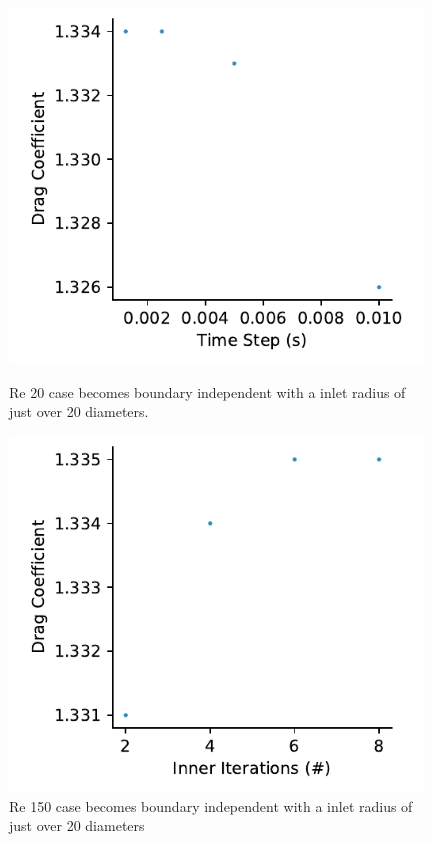 \documentclass[10pt,english]{article}
\begin{document}
\begin{figure}[h!]
\centering
\begin{minipage}{.47\textwidth}
  \centering
\includegraphics[trim={0.0cm 0cm 0.0cm 0cm},clip,width=0.98\textwidth]{timestep150}
\vspace{3pt}
\caption{Re 20 case becomes boundary independent with a inlet radius of just over 20 diameters.}
\label{f:timestep150}
\end{minipage}%
\hspace{10pt}
\begin{minipage}{.47\textwidth}
  \centering
\includegraphics[trim={0.0cm 0cm 0.0cm 0cm},clip,width=0.98\textwidth]{II150}
\caption{Re 150 case becomes boundary independent with a inlet radius of just over 20 diameters}
\label{f:II150}
\end{minipage}
\end{figure}
\end{document}
